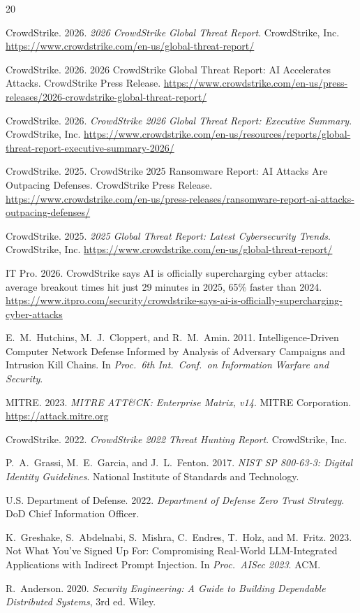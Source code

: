 \documentclass[journal]{IEEEtran}
\begin{document}
\sloppy

\begin{thebibliography}{20}

CrowdStrike. 2026. \textit{2026 CrowdStrike Global Threat Report}. CrowdStrike, Inc.
\url{https://www.crowdstrike.com/en-us/global-threat-report/}

CrowdStrike. 2026. 2026 CrowdStrike Global Threat Report: AI Accelerates Attacks.
CrowdStrike Press Release.
\url{https://www.crowdstrike.com/en-us/press-releases/2026-crowdstrike-global-threat-report/}

CrowdStrike. 2026. \textit{CrowdStrike 2026 Global Threat Report: Executive Summary}.
CrowdStrike, Inc.
\url{https://www.crowdstrike.com/en-us/resources/reports/global-threat-report-executive-summary-2026/}

CrowdStrike. 2025. CrowdStrike 2025 Ransomware Report: AI Attacks Are Outpacing
Defenses. CrowdStrike Press Release.
\url{https://www.crowdstrike.com/en-us/press-releases/ransomware-report-ai-attacks-outpacing-defenses/}

CrowdStrike. 2025. \textit{2025 Global Threat Report: Latest Cybersecurity Trends}.
CrowdStrike, Inc.
\url{https://www.crowdstrike.com/en-us/global-threat-report/}

IT Pro. 2026. CrowdStrike says AI is officially supercharging cyber attacks: average
breakout times hit just 29 minutes in 2025, 65\% faster than 2024.
\url{https://www.itpro.com/security/crowdstrike-says-ai-is-officially-supercharging-cyber-attacks}

E.~M.~Hutchins, M.~J.~Cloppert, and R.~M.~Amin. 2011. Intelligence-Driven Computer
Network Defense Informed by Analysis of Adversary Campaigns and Intrusion Kill
Chains. In \textit{Proc.\ 6th Int.\ Conf.\ on Information Warfare and Security}.

MITRE. 2023. \textit{MITRE ATT\&CK: Enterprise Matrix, v14}. MITRE Corporation.
\url{https://attack.mitre.org}

CrowdStrike. 2022. \textit{CrowdStrike 2022 Threat Hunting Report}. CrowdStrike, Inc.

P.~A.~Grassi, M.~E.~Garcia, and J.~L.~Fenton. 2017. \textit{NIST SP 800-63-3:
Digital Identity Guidelines}. National Institute of Standards and Technology.

U.S. Department of Defense. 2022. \textit{Department of Defense Zero Trust Strategy}.
DoD Chief Information Officer.

K.~Greshake, S.~Abdelnabi, S.~Mishra, C.~Endres, T.~Holz, and M.~Fritz. 2023.
Not What You've Signed Up For: Compromising Real-World LLM-Integrated Applications
with Indirect Prompt Injection. In \textit{Proc.\ AISec 2023}. ACM.

R.~Anderson. 2020. \textit{Security Engineering: A Guide to Building Dependable
Distributed Systems}, 3rd ed. Wiley.

\end{thebibliography}
\end{document}
